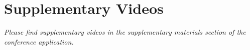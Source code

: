 \documentclass{nime-alternate} %
\begin{document}
\section{Supplementary Videos}
\textit{Please find supplementary videos in the supplementary materials section of the conference application.}



 



\end{document}
